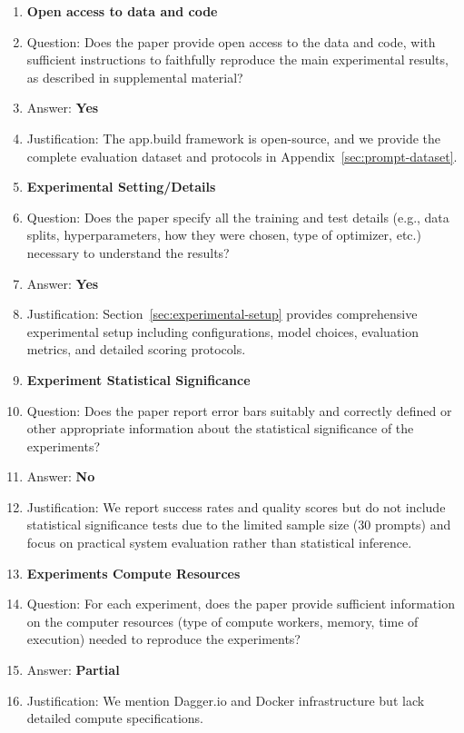 \documentclass{article}
\begin{document}
\begin{enumerate}
\item {\bf Open access to data and code}
    \item[] Question: Does the paper provide open access to the data and code, with sufficient instructions to faithfully reproduce the main experimental results, as described in supplemental material?
    \item[] Answer: \textbf{Yes}
    \item[] Justification: The app.build framework is open-source, and we provide the complete evaluation dataset and protocols in Appendix~\ref{sec:prompt-dataset}.

\item {\bf Experimental Setting/Details}
    \item[] Question: Does the paper specify all the training and test details (e.g., data splits, hyperparameters, how they were chosen, type of optimizer, etc.) necessary to understand the results?
    \item[] Answer: \textbf{Yes}
    \item[] Justification: Section~\ref{sec:experimental-setup} provides comprehensive experimental setup including configurations, model choices, evaluation metrics, and detailed scoring protocols.

\item {\bf Experiment Statistical Significance}
    \item[] Question: Does the paper report error bars suitably and correctly defined or other appropriate information about the statistical significance of the experiments?
    \item[] Answer: \textbf{No}
    \item[] Justification: We report success rates and quality scores but do not include statistical significance tests due to the limited sample size (30 prompts) and focus on practical system evaluation rather than statistical inference.

\item {\bf Experiments Compute Resources}
    \item[] Question: For each experiment, does the paper provide sufficient information on the computer resources (type of compute workers, memory, time of execution) needed to reproduce the experiments?
    \item[] Answer: \textbf{Partial}
    \item[] Justification: We mention Dagger.io and Docker infrastructure but lack detailed compute specifications.


\end{enumerate}
\end{document}
